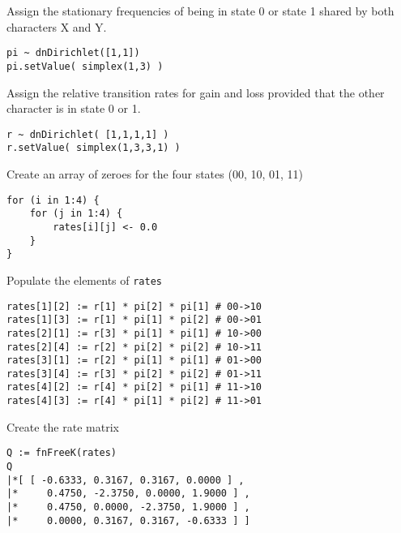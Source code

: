 Assign the stationary frequencies of being in state 0 or state 1 shared by both characters X and Y.

{\tt \begin{snugshade*}
\begin{lstlisting}
pi ~ dnDirichlet([1,1])
pi.setValue( simplex(1,3) )
\end{lstlisting}
\end{snugshade*}}

Assign the relative transition rates for gain and loss provided that the other character is in state 0 or 1.

{\tt \begin{snugshade*}
\begin{lstlisting}
r ~ dnDirichlet( [1,1,1,1] )
r.setValue( simplex(1,3,3,1) )
\end{lstlisting}
\end{snugshade*}}

Create an array of zeroes for the four states (00, 10, 01, 11)

{\tt \begin{snugshade*}
\begin{lstlisting}
for (i in 1:4) {
    for (j in 1:4) {
        rates[i][j] <- 0.0
    }
}
\end{lstlisting}
\end{snugshade*}}

Populate the elements of {\tt rates}

{\tt \begin{snugshade*}
\begin{lstlisting}
rates[1][2] := r[1] * pi[2] * pi[1] # 00->10
rates[1][3] := r[1] * pi[1] * pi[2] # 00->01
rates[2][1] := r[3] * pi[1] * pi[1] # 10->00
rates[2][4] := r[2] * pi[2] * pi[2] # 10->11
rates[3][1] := r[2] * pi[1] * pi[1] # 01->00
rates[3][4] := r[3] * pi[2] * pi[2] # 01->11
rates[4][2] := r[4] * pi[2] * pi[1] # 11->10
rates[4][3] := r[4] * pi[1] * pi[2] # 11->01
\end{lstlisting}
\end{snugshade*}}

Create the rate matrix

{\tt \begin{snugshade*}
\begin{lstlisting}
Q := fnFreeK(rates)
Q
|*[ [ -0.6333, 0.3167, 0.3167, 0.0000 ] ,
|*     0.4750, -2.3750, 0.0000, 1.9000 ] ,
|*     0.4750, 0.0000, -2.3750, 1.9000 ] ,
|*     0.0000, 0.3167, 0.3167, -0.6333 ] ]
\end{lstlisting}
\end{snugshade*}}

